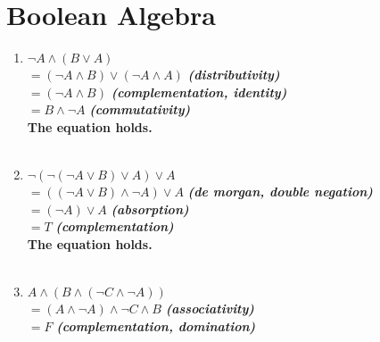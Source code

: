 \documentclass{article}
\newcommand{\size}[2]{{\fontsize{#1}{0}\selectfont#2}}
\begin{document}
    \section{Boolean Algebra}
    \begin{enumerate}
        \item $\lnot A \land (B \lor A)$ \\
        $= (\lnot A \land B) \lor (\lnot A \land A)$ \textit{\textbf{\size{7}{(distributivity)}}} \\
        $= (\lnot A \land B) $ \textit{\textbf{\size{7}{(complementation, identity)}}} \\
        $= B \land \lnot A$ \textit{\textbf{\size{7}{(commutativity)}}} \\
        \textbf{The equation holds.} \\ \\

        \item $\lnot(\lnot(\lnot A \lor B) \lor A) \lor A$ \\
        $= ((\lnot A \lor B) \land \lnot A) \lor A$ \textit{\textbf{\size{7}{(de morgan, double negation)}}} \\
        $= (\lnot A) \lor A$ \textit{\textbf{\size{7}{(absorption)}}} \\
        $= T$ \textit{\textbf{\size{7}{(complementation)}}} \\
        \textbf{The equation holds.} \\ \\

        \item $A \land (B \land (\lnot C \land \lnot A))$ \\
        $= (A \land \lnot A) \land \lnot C \land B$ \textit{\textbf{\size{7}{(associativity)}}} \\
        $= F$ \textit{\textbf{\size{7}{(complementation, domination)}}} \\


\end{enumerate}
\end{document}
